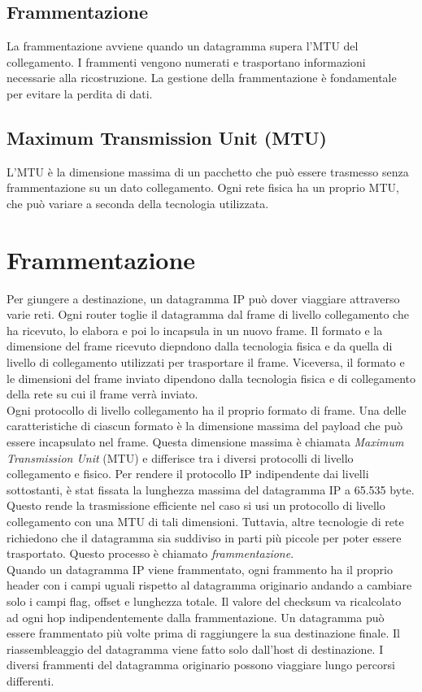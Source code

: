 \documentclass[12pt]{report}
\begin{document}
\subsection{Frammentazione}
La frammentazione avviene quando un datagramma supera l’MTU del collegamento. I frammenti vengono numerati e trasportano informazioni necessarie alla ricostruzione. La gestione della frammentazione è fondamentale per evitare la perdita di dati.

\subsection{Maximum Transmission Unit (MTU)}
L’MTU è la dimensione massima di un pacchetto che può essere trasmesso senza frammentazione su un dato collegamento. Ogni rete fisica ha un proprio MTU, che può variare a seconda della tecnologia utilizzata.

\section{Frammentazione}
Per giungere a destinazione, un datagramma IP può dover viaggiare attraverso varie reti. Ogni router toglie il datagramma dal frame di livello collegamento che ha ricevuto, lo elabora e poi lo incapsula in un nuovo frame. Il formato e la dimensione del frame ricevuto diepndono dalla tecnologia fisica e da quella di livello di collegamento utilizzati per trasportare il frame. Viceversa, il formato e le dimensioni del frame inviato dipendono dalla tecnologia fisica e di collegamento della rete su cui il frame verrà inviato.
\vspace{\baselineskip}\\
Ogni protocollo di livello collegamento ha il proprio formato di frame. Una delle caratteristiche di ciascun formato è la dimensione massima del payload che può essere incapsulato nel frame. Questa dimensione massima è chiamata \textit{Maximum Transmission Unit} (MTU) e differisce tra i diversi protocolli di livello collegamento e fisico. Per rendere il protocollo IP indipendente dai livelli sottostanti, è stat fissata la lunghezza massima del datagramma IP a 65.535 byte. Questo rende la trasmissione efficiente nel caso si usi un protocollo di livello collegamento con una MTU di tali dimensioni. Tuttavia, altre tecnologie di rete richiedono che il datagramma sia suddiviso in parti più piccole per poter essere trasportato. Questo processo è chiamato \textit{frammentazione}.
\vspace{\baselineskip}\\
Quando un datagramma IP viene frammentato, ogni frammento ha il proprio header con i campi uguali rispetto al datagramma originario andando a cambiare solo i campi flag, offset e lunghezza totale. Il valore del checksum va ricalcolato ad ogni hop indipendentemente dalla frammentazione. Un datagramma può essere frammentato più volte prima di raggiungere la sua destinazione finale. Il riassembleaggio del datagramma viene fatto solo dall'host di destinazione. I diversi frammenti del datagramma originario possono viaggiare lungo percorsi differenti.
\end{document}
